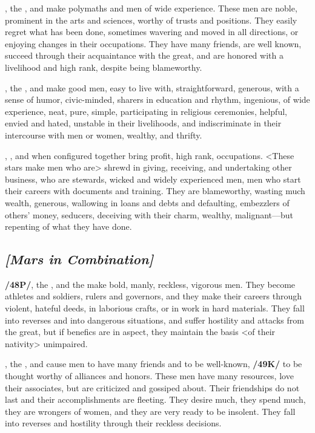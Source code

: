 \Mercury, the \Sun, and \Venus\xspace make polymaths and men of wide experience. These men are noble, prominent in the arts and sciences, worthy of trusts and positions. They easily regret what has been done, sometimes wavering and moved in all directions, or enjoying changes in their occupations. They have many friends, are well known, succeed through their acquaintance with the great, and are honored with a livelihood and high rank, despite being blameworthy.

\Mercury, the \Moon, and \Venus\xspace make good men, easy to live with, straightforward, generous, with a sense of humor, civic-minded, sharers in education and rhythm, ingenious, of wide experience, neat, pure, simple, participating in religious ceremonies, helpful, envied and hated, unstable in their livelihoods, and indiscriminate in their intercourse with men or women, wealthy, and thrifty.

\Mercury, \Mars, and \Venus\xspace when configured together bring profit, high rank, occupations. <These stars make men who are> shrewd in giving, receiving, and undertaking other business, who are stewards, wicked and widely experienced men, men who start their careers with documents and training. They are blameworthy, wasting much wealth, generous, wallowing in loans and debts and defaulting, embezzlers of others’ money, seducers, deceiving with their charm, wealthy, malignant—but repenting of what they have done.

\secbr
{}
\subsection{\textit{[Mars in Combination]}}
\textbf{/48P/}\Mars, the \Sun, and the \Moon\xspace make bold, manly, reckless, vigorous men. They become athletes and soldiers, rulers and governors, and they make their careers through violent, hateful deeds, in laborious crafts, or in work in hard materials. They fall into reverses and into dangerous situations, and suffer hostility and attacks from the great, but if benefics are in aspect, they maintain the basis <of their nativity> unimpaired.

\Mars, the \Sun, and \Venus\xspace cause men to have many friends and to be well-known, \textbf{/49K/} to be thought
worthy of alliances and honors. These men have many resources, love their associates, but are criticized and gossiped about. Their friendships do not last and their accomplishments are fleeting. They desire much, they spend much, they are wrongers of women, and they are very ready to be insolent. They fall
into reverses and hostility through their reckless decisions.

